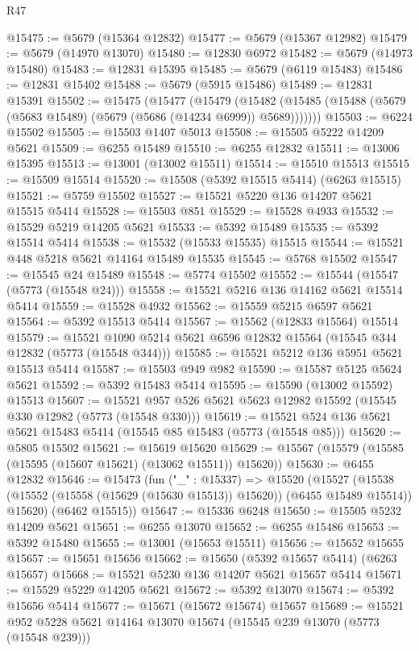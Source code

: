 \begin{lexlean}{R47}
\begin{coremodule}
@15475 := @5679 (@15364 @12832)
@15477 := @5679 (@15367 @12982)
@15479 := @5679 (@14970 @13070)
@15480 := @12830 @6972
@15482 := @5679 (@14973 @15480)
@15483 := @12831 @15395
@15485 := @5679 (@6119 @15483)
@15486 := @12831 @15402
@15488 := @5679 (@5915 @15486)
@15489 := @12831 @15391
@15502 := @15475
    (@15477
      (@15479
        (@15482 (@15485 (@15488 (@5679 (@5683 @15489) (@5679 (@5686 (@14234 @6999)) @5689)))))))
@15503 := @6224 @15502
@15505 := @15503 @1407 @5013
@15508 := @15505 @5222 @14209 @5621
@15509 := @6255 @15489
@15510 := @6255 @12832
@15511 := @13006 @15395
@15513 := @13001 (@13002 @15511)
@15514 := @15510 @15513
@15515 := @15509 @15514
@15520 := @15508 (@5392 @15515 @5414) (@6263 @15515)
@15521 := @5759 @15502
@15527 := @15521 @5220 @136 @14207 @5621 @15515 @5414
@15528 := @15503 @851
@15529 := @15528 @4933
@15532 := @15529 @5219 @14205 @5621
@15533 := @5392 @15489
@15535 := @5392 @15514 @5414
@15538 := @15532 (@15533 @15535) @15515
@15544 := @15521 @448 @5218 @5621 @14164 @15489 @15535
@15545 := @5768 @15502
@15547 := @15545 @24 @15489
@15548 := @5774 @15502
@15552 := @15544 (@15547 (@5773 (@15548 @24)))
@15558 := @15521 @5216 @136 @14162 @5621 @15514 @5414
@15559 := @15528 @4932
@15562 := @15559 @5215 @6597 @5621
@15564 := @5392 @15513 @5414
@15567 := @15562 (@12833 @15564) @15514
@15579 := @15521 @1090 @5214 @5621 @6596 @12832 @15564 (@15545 @344 @12832 (@5773 (@15548 @344)))
@15585 := @15521 @5212 @136 @5951 @5621 @15513 @5414
@15587 := @15503 @949 @982
@15590 := @15587 @5125 @5624 @5621
@15592 := @5392 @15483 @5414
@15595 := @15590 (@13002 @15592) @15513
@15607 := @15521 @957 @526 @5621 @5623 @12982 @15592 (@15545 @330 @12982 (@5773 (@15548 @330)))
@15619 := @15521 @524 @136 @5621 @5621 @15483 @5414 (@15545 @85 @15483 (@5773 (@15548 @85)))
@15620 := @5805 @15502
@15621 := @15619 @15620
@15629 := @15567 (@15579 (@15585 (@15595 (@15607 @15621) (@13062 @15511)) @15620))
@15630 := @6455 @12832
@15646 := @15473
    (fun ("_" : @15337) =>
    @15520
      (@15527
        (@15538 (@15552 (@15558 (@15629 (@15630 @15513)) @15620)) (@6455 @15489 @15514))
        @15620)
      (@6462 @15515))
@15647 := @15336 @6248
@15650 := @15505 @5232 @14209 @5621
@15651 := @6255 @13070
@15652 := @6255 @15486
@15653 := @5392 @15480
@15655 := @13001 (@15653 @15511)
@15656 := @15652 @15655
@15657 := @15651 @15656
@15662 := @15650 (@5392 @15657 @5414) (@6263 @15657)
@15668 := @15521 @5230 @136 @14207 @5621 @15657 @5414
@15671 := @15529 @5229 @14205 @5621
@15672 := @5392 @13070
@15674 := @5392 @15656 @5414
@15677 := @15671 (@15672 @15674) @15657
@15689 := @15521 @952 @5228 @5621 @14164 @13070 @15674 (@15545 @239 @13070 (@5773 (@15548 @239)))

\end{coremodule}
\end{lexlean}

